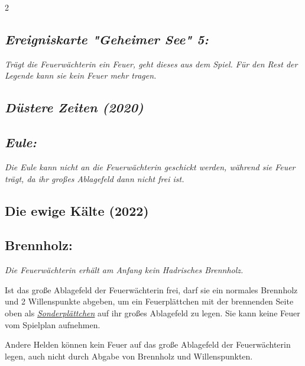 \documentclass[10pt, a4paper, oneside]{book}
\newcommand{\fan}[1]{\textit{#1}}
\begin{document}
\begin{multicols*}{2}
\begin{bgcolor}
\subsection{\fan{Ereigniskarte "Geheimer See" 5:}}

\fan{Trägt die Feuerwächterin ein Feuer, geht dieses aus dem Spiel. Für den Rest der Legende kann sie kein Feuer mehr tragen.}

\end{bgcolor}






\begin{bgcolor}[color-dz]
\section{\fan{Düstere Zeiten (2020)}}


\subsection{\fan{Eule:}}

\fan{Die Eule kann nicht an die Feuerwächterin geschickt werden, während sie Feuer trägt, da ihr großes Ablagefeld dann nicht frei ist.}

\end{bgcolor}



\columnbreak


\begin{bgcolor}
\section{Die ewige Kälte (2022)}

\subsection{Brennholz:}

\fan{Die Feuerwächterin erhält am Anfang kein Hadrisches Brennholz.}

Ist das große Ablagefeld der Feuerwächterin frei, darf sie ein normales Brennholz und 2 Willenspunkte abgeben, um ein Feuerplättchen mit der brennenden Seite oben als \hyperref[gegenstaende-und-sonderplaettchen]{\fan{Sonderplättchen}} auf ihr großes Ablagefeld zu legen. Sie kann keine Feuer vom Spielplan aufnehmen.

Andere Helden können kein Feuer auf das große Ablagefeld der Feuerwächterin legen, auch nicht durch Abgabe von Brennholz und Willenspunkten.
\supercite{105294}





\end{bgcolor}
\end{multicols*}
\end{document}
